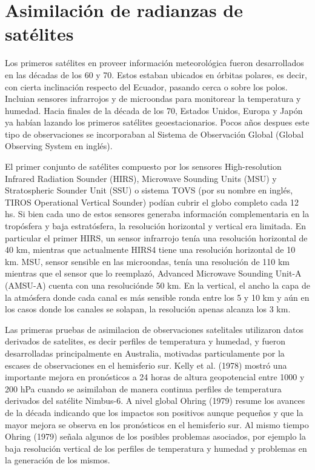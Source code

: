 \documentclass[12pt,oneside]{reedthesis}
\begin{document}
\hypertarget{asim-rad}{%
\section{Asimilación de radianzas de satélites}\label{asim-rad}}

Los primeros satélites en proveer información meteorológica fueron desarrollados en las décadas de los 60 y 70. Estos estaban ubicados en órbitas polares, es decir, con cierta inclinación respecto del Ecuador, pasando cerca o sobre los polos. Incluian sensores infrarrojos y de microondas para monitorear la temperatura y humedad. Hacia finales de la década de los 70, Estados Unidos, Europa y Japón ya habían lazando los primeros satélites geoestacionarios. Pocos años despues este tipo de observaciones se incorporaban al Sistema de Observación Global (Global Observing System en inglés).

El primer conjunto de satélites compuesto por los sensores High-resolution Infrared Radiation Sounder (HIRS), Microwave Sounding Units (MSU) y Stratospheric Sounder Unit (SSU) o sistema TOVS (por su nombre en inglés, TIROS Operational Vertical Sounder) podían cubrir el globo completo cada 12 hs. Si bien cada uno de estos sensores generaba información complementaria en la tropósfera y baja estratósfera, la resolución horizontal y vertical era limitada. En particular el primer HIRS, un sensor infrarrojo tenía una resolución horizontal de 40 km, mientras que actualmente HIRS4 tiene una resolución horizontal de 10 km. MSU, sensor sensible en las microondas, tenía una resolución de 110 km mientras que el sensor que lo reemplazó, Advanced Microwave Sounding Unit-A (AMSU-A) cuenta con una resoluciónde 50 km. En la vertical, el ancho la capa de la atmósfera donde cada canal es más sensible ronda entre los 5 y 10 km y aún en los casos donde los canales se solapan, la resolución apenas alcanza los 3 km.

Las primeras pruebas de asimilacion de observaciones satelitales utilizaron datos derivados de satelites, es decir perfiles de temperatura y humedad, y fueron desarrolladas principalmente en Australia, motivadas particulamente por la escases de observaciones en el hemisferio sur. Kelly et al. (1978) mostró una importante mejora en pronósticos a 24 horas de altura geopotencial entre 1000 y 200 hPa cuando se asimilaban de manera continua perfiles de temperatura derivados del satélite Nimbus-6. A nivel global Ohring (1979) resume los avances de la década indicando que los impactos son positivos aunque pequeños y que la mayor mejora se observa en los pronósticos en el hemisferio sur. Al mismo tiempo Ohring (1979) señala algunos de los posibles problemas asociados, por ejemplo la baja resolución vertical de los perfiles de temperatura y humedad y problemas en la generación de los mismos.
\end{document}
